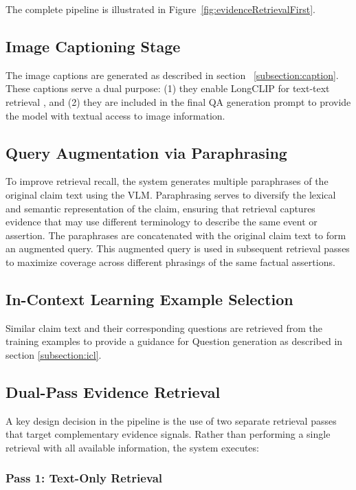 The complete pipeline is illustrated in Figure~\ref{fig:evidenceRetrievalFirst}.

\subsection{Image Captioning Stage}

The image captions are generated as described in section ~\ref{subsection:caption}. These captions serve a dual purpose: (1) they enable LongCLIP for text-text retrieval , and (2) they are included in the final QA generation prompt to provide the model with textual access to image information.

\subsection{Query Augmentation via Paraphrasing}

To improve retrieval recall, the system generates multiple paraphrases of the original claim text using the VLM.
 Paraphrasing serves to diversify the lexical and semantic representation of the claim, ensuring that retrieval captures evidence that may use different terminology to describe the same event or assertion. The paraphrases are concatenated with the original claim text to form an augmented query. This augmented query is used in subsequent retrieval passes to maximize coverage across different phrasings of the same factual assertions.

\subsection{In-Context Learning Example Selection}
Similar claim text and their corresponding questions are retrieved from the training examples to provide a guidance for Question generation as described in section \ref{subsection:icl}.


\subsection{Dual-Pass Evidence Retrieval}

A key design decision in the pipeline is the use of two separate retrieval passes that target complementary evidence signals. Rather than performing a single retrieval with all available information, the system executes:

\subsubsection{Pass 1: Text-Only Retrieval}

